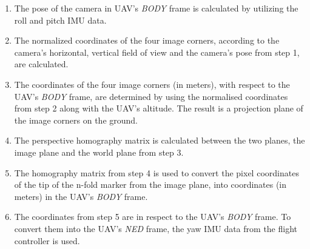 \documentclass[conference, onecolumn, draftclsnofoot]{IEEEtran}
\begin{document}
\begin{enumerate}

\item The pose of the camera in UAV's \emph{BODY} frame is calculated by 
utilizing the roll and pitch IMU data.


\item The normalized coordinates of the four image corners, according to the 
camera's horizontal, vertical field of view and the camera's pose from step 1, 
are calculated.


\item The coordinates of the four image corners (in meters), with respect to 
the UAV's \emph{BODY} frame, are determined by using the normalised coordinates from 
step 2 along with the UAV's altitude. The result is a projection plane of the 
image corners on the ground.


\item The perspective homography matrix is calculated between the two planes, 
the image plane and the world plane from step 3.


\item The homography matrix from step 4 is used to convert the pixel coordinates 
of the tip of the n-fold marker from the image plane, into  coordinates (in meters) 
in the UAV's \emph{BODY} frame.


\item The coordinates from step 5 are in respect to the UAV's \emph{BODY} frame. 
To convert them into the UAV's \emph{NED} frame, the yaw IMU data from the flight 
controller is used. 


\end{enumerate}
\end{document}
